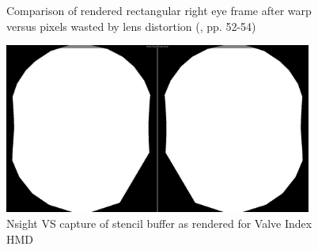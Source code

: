 \begin{figure}[h]
  \centering
  \hspace*{\fill}
  \hfill
  \hspace*{\fill}
     \caption{Comparison of rendered rectangular right eye frame after warp versus pixels wasted by lens distortion (\cite{Vlachos.2015}, pp. 52-54)}
     \label{fig:stencil_wastecomparison}
\end{figure}

\begin{figure}[htb]
  \centering
  \includegraphics[width=0.9\textwidth]{pictures/stencilmask_Index_crop}
  \caption{Nsight VS capture of stencil buffer as rendered for Valve Index HMD} \label{fig:stencil_index}
\end{figure}

